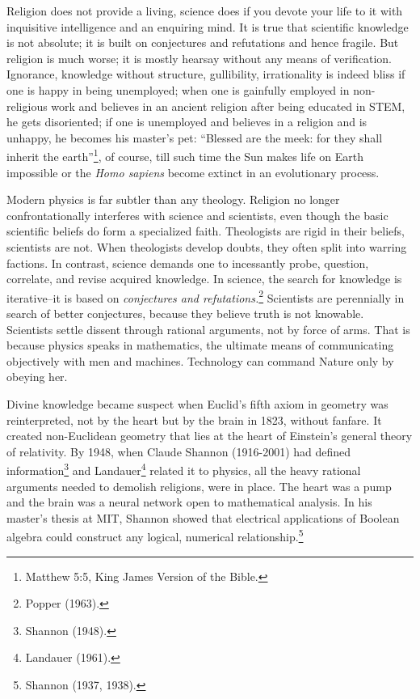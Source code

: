 \begin{multicols}{2}
\vskip -2pt

Religion does not provide a living, science does if you devote your life to it with inquisitive intelligence and an enquiring mind. It is true that scientific knowledge is not absolute; it is built on conjectures and refutations and hence fragile. But religion is much worse; it is mostly hearsay without any means of verification. Ignorance, knowledge without structure, gullibility, irrationality is indeed bliss if one is happy in being unemployed; when one is gainfully employed in non-religious work and believes in an ancient religion after being educated in STEM, he gets disoriented; if one is unemployed and believes in a religion and is unhappy, he becomes his master's pet: “Blessed are the meek: for they shall inherit the earth”\footnote{Matthew 5:5, King James Version of the Bible.}, of course, till such time the Sun makes life on Earth impossible or the \textit{Homo sapiens} become extinct in an evolutionary process.

\vskip -2pt

Modern physics is far subtler than any theology. Religion no longer confrontationally interferes with science and scientists, even though the basic scientific beliefs do form a specialized faith. Theologists are rigid in their beliefs, scientists are not. When theologists develop doubts, they often split into warring factions. In contrast, science demands one to incessantly probe, question, correlate, and revise acquired knowledge. In science, the search for knowledge is iterative--it is based on \textit{conjectures and refutations.}\footnote{Popper (1963).} Scientists are perennially in search of better conjectures, because they believe truth is not knowable. Scientists settle dissent through rational arguments, not by force of arms. That is because physics speaks in mathematics, the ultimate means of communicating objectively with men and machines. Technology can command Nature only by obeying her.

\vskip -2pt

Divine knowledge became suspect when Euclid's fifth axiom in geometry was reinterpreted, not by the heart but by the brain in 1823, without fanfare. It created non-Euclidean geometry that lies at the heart of Einstein's general theory of relativity. By 1948, when Claude Shannon (1916-2001) had defined information\footnote{Shannon (1948).}  and Landauer\footnote{Landauer (1961).}  related it to physics, all the heavy rational arguments needed to demolish religions, were in place. The heart was a pump and the brain was a neural network open to mathematical analysis. In his master's thesis at MIT, Shannon showed that electrical applications of Boolean algebra could construct any logical, numerical relationship.\footnote{Shannon (1937, 1938).}


\end{multicols}
